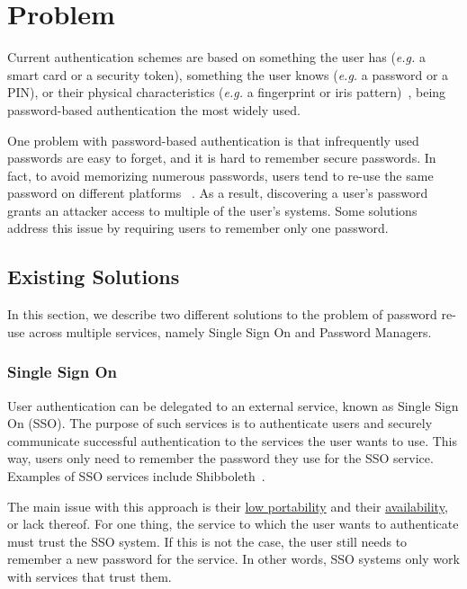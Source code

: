 \documentclass[a4paper, 11pt]{article}
\begin{document}
    \pagebreak


    \section{Problem} \label{sec:problem}

    Current authentication schemes are based on something the user has (\textit{e.g.} a smart card or a
    security token), something the user knows (\textit{e.g.} a password or a PIN), or their physical
    characteristics (\textit{e.g.} a fingerprint or iris pattern)~\cite{1246384}, being password-based
    authentication the most widely used.

    One problem with password-based authentication is that infrequently used passwords are easy to forget, and it is hard
    to remember secure passwords.
    In fact, to avoid memorizing numerous passwords, users tend to re-use the same password on different platforms
    ~\cite{florencio2006a}.
    As a result, discovering a user's password grants an attacker access to multiple of the user's systems.
    Some solutions address this issue by requiring users to remember only one password.

    \subsection{Existing Solutions} \label{subsec:solutions}

    In this section, we describe two different solutions to the problem of password re-use across
    multiple services, namely Single Sign On and Password Managers.

    \subsubsection{Single Sign On}

    User authentication can be delegated to an external service, known as Single Sign On (SSO).
    The purpose of such services is to authenticate users and securely communicate successful authentication to the services
    the user wants to use.
    This way, users only need to remember the password they use for the SSO service.
    Examples of SSO services include Shibboleth~\cite{10.1007/978-3-642-37282-7_14}.

    The main issue with this approach is their \uline{low portability} and their \uline{availability}, or lack thereof.
    For one thing, the service to which the user wants to authenticate must trust the SSO system.
    If this is not the case, the user still needs to remember a new password for the service.
    In other words, SSO systems only work with services that trust them.
\end{document}
